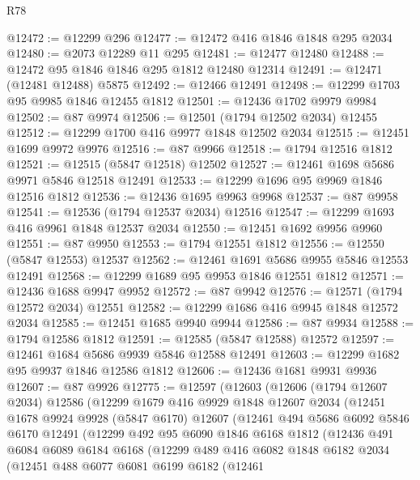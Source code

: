 \begin{lexlean}{R78}
\begin{coremodule}
@12472 := @12299 @296
@12477 := @12472 @416 @1846 @1848 @295 @2034
@12480 := @2073 @12289 @11 @295
@12481 := @12477 @12480
@12488 := @12472 @95 @1846 @1846 @295 @1812 @12480 @12314
@12491 := @12471 (@12481 @12488) @5875
@12492 := @12466 @12491
@12498 := @12299 @1703 @95 @9985 @1846 @12455 @1812
@12501 := @12436 @1702 @9979 @9984
@12502 := @87 @9974
@12506 := @12501 (@1794 @12502 @2034) @12455
@12512 := @12299 @1700 @416 @9977 @1848 @12502 @2034
@12515 := @12451 @1699 @9972 @9976
@12516 := @87 @9966
@12518 := @1794 @12516 @1812
@12521 := @12515 (@5847 @12518) @12502
@12527 := @12461 @1698 @5686 @9971 @5846 @12518 @12491
@12533 := @12299 @1696 @95 @9969 @1846 @12516 @1812
@12536 := @12436 @1695 @9963 @9968
@12537 := @87 @9958
@12541 := @12536 (@1794 @12537 @2034) @12516
@12547 := @12299 @1693 @416 @9961 @1848 @12537 @2034
@12550 := @12451 @1692 @9956 @9960
@12551 := @87 @9950
@12553 := @1794 @12551 @1812
@12556 := @12550 (@5847 @12553) @12537
@12562 := @12461 @1691 @5686 @9955 @5846 @12553 @12491
@12568 := @12299 @1689 @95 @9953 @1846 @12551 @1812
@12571 := @12436 @1688 @9947 @9952
@12572 := @87 @9942
@12576 := @12571 (@1794 @12572 @2034) @12551
@12582 := @12299 @1686 @416 @9945 @1848 @12572 @2034
@12585 := @12451 @1685 @9940 @9944
@12586 := @87 @9934
@12588 := @1794 @12586 @1812
@12591 := @12585 (@5847 @12588) @12572
@12597 := @12461 @1684 @5686 @9939 @5846 @12588 @12491
@12603 := @12299 @1682 @95 @9937 @1846 @12586 @1812
@12606 := @12436 @1681 @9931 @9936
@12607 := @87 @9926
@12775 := @12597
    (@12603
      (@12606
        (@1794 @12607 @2034)
        @12586
        (@12299
          @1679
          @416
          @9929
          @1848
          @12607
          @2034
          (@12451
            @1678
            @9924
            @9928
            (@5847 @6170)
            @12607
            (@12461
              @494
              @5686
              @6092
              @5846
              @6170
              @12491
              (@12299
                @492
                @95
                @6090
                @1846
                @6168
                @1812
                (@12436
                  @491
                  @6084
                  @6089
                  @6184
                  @6168
                  (@12299
                    @489
                    @416
                    @6082
                    @1848
                    @6182
                    @2034
                    (@12451
                      @488
                      @6077
                      @6081
                      @6199
                      @6182
                      (@12461

\end{coremodule}
\end{lexlean}
